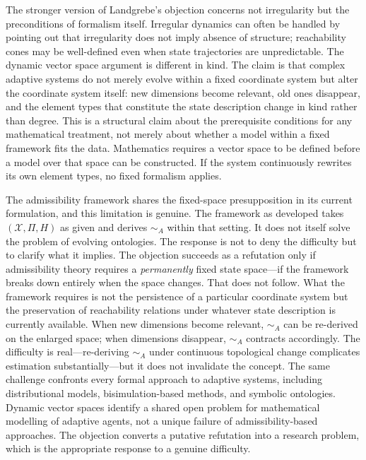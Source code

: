 \documentclass[11pt, a4paper]{article}
\theoremstyle{plain}
\theoremstyle{definition}
\theoremstyle{remark}
\newcommand{\simA}{\sim_A}
\begin{document}
The stronger version of Landgrebe's objection concerns not irregularity but the preconditions of formalism itself. Irregular dynamics can often be handled by pointing out that irregularity does not imply absence of structure; reachability cones may be well-defined even when state trajectories are unpredictable. The dynamic vector space argument is different in kind. The claim is that complex adaptive systems do not merely evolve within a fixed coordinate system but alter the coordinate system itself: new dimensions become relevant, old ones disappear, and the element types that constitute the state description change in kind rather than degree. This is a structural claim about the prerequisite conditions for any mathematical treatment, not merely about whether a model within a fixed framework fits the data. Mathematics requires a vector space to be defined before a model over that space can be constructed. If the system continuously rewrites its own element types, no fixed formalism applies.

The admissibility framework shares the fixed-space presupposition in its current formulation, and this limitation is genuine. The framework as developed takes $(\mathcal{X}, \Pi, H)$ as given and derives $\simA$ within that setting. It does not itself solve the problem of evolving ontologies. The response is not to deny the difficulty but to clarify what it implies. The objection succeeds as a refutation only if admissibility theory requires a \emph{permanently} fixed state space---if the framework breaks down entirely when the space changes. That does not follow. What the framework requires is not the persistence of a particular coordinate system but the preservation of reachability relations under whatever state description is currently available. When new dimensions become relevant, $\simA$ can be re-derived on the enlarged space; when dimensions disappear, $\simA$ contracts accordingly. The difficulty is real---re-deriving $\simA$ under continuous topological change complicates estimation substantially---but it does not invalidate the concept. The same challenge confronts every formal approach to adaptive systems, including distributional models, bisimulation-based methods, and symbolic ontologies. Dynamic vector spaces identify a shared open problem for mathematical modelling of adaptive agents, not a unique failure of admissibility-based approaches. The objection converts a putative refutation into a research problem, which is the appropriate response to a genuine difficulty.
\end{document}
